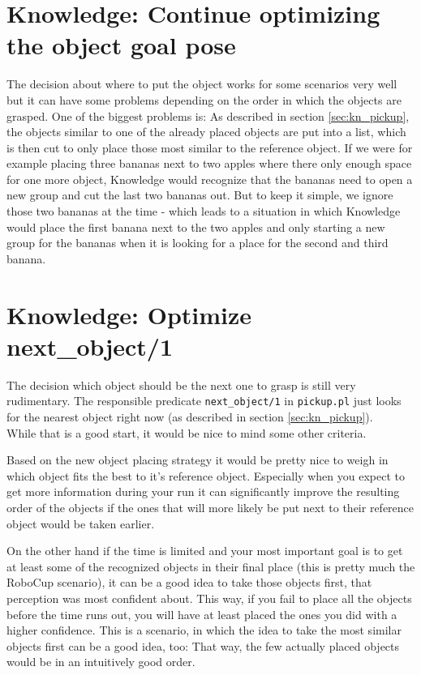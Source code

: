 \documentclass[main.tex]{subfiles}
\begin{document}
		\section{Knowledge: Continue optimizing the object goal pose}
		The decision about where to put the object works for some scenarios very well but it can have some problems depending on the order in which the objects are grasped. One of the biggest problems is: As described in section \ref{sec:kn_pickup}, the objects  similar to one of the already placed objects are put into a list, which is then cut to only place those most similar to the reference object. If we were for example placing three bananas next to two apples where there only enough space for one more object, Knowledge would recognize that the bananas need to open a new group and cut the last two bananas out. But to keep it simple, we ignore those two bananas at the time - which leads to a situation in which Knowledge would place the first banana next to the two apples and only starting a new group for the bananas when it is looking for a place for the second and third banana.
	  	
	  	\section{Knowledge: Optimize next\_object/1}\label{sec:nextObj}
	  	The decision which object should be the next one to grasp is still very rudimentary. The responsible predicate \texttt{next\_object/1} in \texttt{pickup.pl} just looks for the nearest object right now (as described in section \ref{sec:kn_pickup}).\\
	  	While that is a good start, it would be nice to mind some other criteria.
	  	
	  	Based on the new object placing strategy it would be pretty nice to weigh in which object fits the best to it's reference object. Especially when you expect to get more information during your run it can significantly improve the resulting order of the objects if the ones that will more likely be put next to their reference object would be taken earlier.
	  	
		On the other hand if the time is limited and your most important goal is to get at least some of the recognized objects in their final place (this is pretty much the RoboCup scenario), it can be a good idea to take those objects first, that perception was most confident about. This way, if you fail to place all the objects before the time runs out, you will have at least placed the ones you did with a higher confidence. This is a scenario, in which the idea to take the most similar objects first can be a good idea, too: That way, the few actually placed objects would be in an intuitively good order.
		
\end{document}
